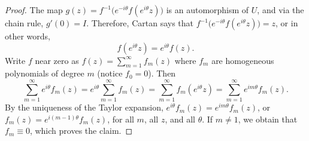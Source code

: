 \documentclass[12pt,openany]{book}
\theoremstyle{plain}
\theoremstyle{remark}
\theoremstyle{definition}
\theoremstyle{exercise}
\theoremstyle{example}
\begin{document}
\begin{proof}
The map $g(z) = f^{-1}\bigl(e^{-i\theta}f(e^{i\theta} z)\bigr)$ is an
automorphism of $U$, and via the
chain rule, $g'(0) = I$.  Therefore,
Cartan says that
$f^{-1}\bigl(e^{-i\theta}f(e^{i\theta} z)\bigr) = z$, or in other words,
\begin{equation*}
f(e^{i\theta} z) = e^{i\theta}f(z) .
\end{equation*}
Write $f$ near zero as $f(z) = \sum_{m=1}^\infty f_m(z)$ where $f_m$ are
homogeneous polynomials of degree $m$ (notice $f_0 = 0$).  Then
\begin{equation*}
\sum_{m=1}^\infty e^{i\theta} f_m(z)
=
e^{i\theta} \sum_{m=1}^\infty f_m(z)
=
\sum_{m=1}^\infty f_m(e^{i\theta} z)
=
\sum_{m=1}^\infty e^{im\theta}f_m(z) .
\end{equation*}
By the uniqueness of the Taylor expansion,
$e^{i\theta} f_m(z)  = e^{im\theta} f_m(z)$, or
$f_m(z)  = e^{i(m-1)\theta} f_m(z)$,
for all $m$, all $z$, and all $\theta$.
If $m \neq 1$, we obtain that $f_m \equiv
0$, which proves the claim.
\end{proof}
\end{document}
